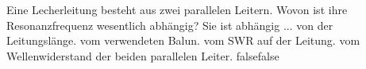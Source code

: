     {Eine Lecherleitung besteht aus zwei parallelen Leitern. Wovon ist ihre Resonanzfrequenz wesentlich abhängig? Sie ist abhängig ...}
    {von der Leitungslänge.}
    {vom verwendeten Balun.}
    {vom SWR auf der Leitung.}
    {vom Wellenwiderstand der beiden parallelen Leiter.}
    {false}{false}